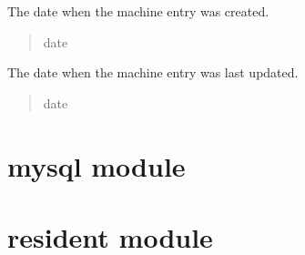 \documentclass[letterpaper,10pt,english]{sphinxmanual}
\begin{document}
\begin{fulllineitems}

\begin{fulllineitems}
\label{\detokenize{app.mysql:app.mysql.machine.Machine.createDate}}
\pysigstartsignatures
\pysigline
{}
\pysigstopsignatures
\sphinxAtStartPar
The date when the machine entry was created.
\begin{quote}\begin{description}
\sphinxAtStartPar
date

\end{description}\end{quote}

\end{fulllineitems}


\begin{fulllineitems}
\label{\detokenize{app.mysql:app.mysql.machine.Machine.update}}
\pysigstartsignatures
\pysigline
{}
\pysigstopsignatures
\sphinxAtStartPar
The date when the machine entry was last updated.
\begin{quote}\begin{description}
\sphinxAtStartPar
date

\end{description}\end{quote}

\end{fulllineitems}


\end{fulllineitems}



\section{mysql module}
\label{\detokenize{app.mysql:module-app.mysql.mysql}}\label{\detokenize{app.mysql:mysql-module}}

\section{resident module}
\label{\detokenize{app.mysql:module-app.mysql.resident}}\label{\detokenize{app.mysql:resident-module}}
\end{document}
